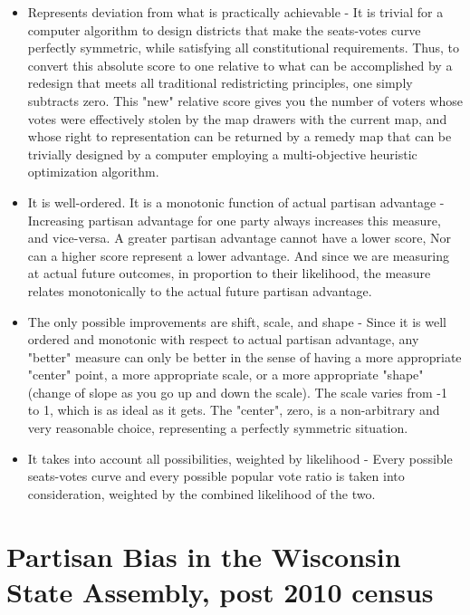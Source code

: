 \documentclass[preprint,12pt]{article}
\begin{document}
\begin{itemize}
\item Represents deviation from what is practically achievable - It is trivial for a computer algorithm to design districts that make the seats-votes curve perfectly symmetric, while satisfying all constitutional requirements.  Thus, to convert this absolute score to one relative to what can be accomplished by a redesign that meets all traditional redistricting principles, one simply subtracts zero.  This "new" relative score gives you the number of voters whose votes were effectively stolen by the map drawers with the current map, and whose right to representation can be returned by a remedy map that can be trivially designed by a computer employing a multi-objective heuristic optimization algorithm.

\item It is well-ordered.  It is a monotonic function of actual partisan advantage - Increasing partisan advantage for one party always increases this measure, and vice-versa.  A greater partisan advantage cannot have a lower score, Nor can a higher score represent a lower advantage.  And since we are measuring at actual future outcomes, in proportion to their likelihood, the measure relates monotonically to the actual future partisan advantage.
 
\item The only possible improvements are shift, scale, and shape - Since it is well ordered and monotonic with respect to actual partisan advantage, any "better" measure can only be better in the sense of having a more appropriate "center" point, a more appropriate scale, or a more appropriate "shape" (change of slope as you go up and down the scale).  The scale varies from -1 to 1, which is as ideal as it gets.  The "center",  zero, is a non-arbitrary and very reasonable choice, representing a perfectly symmetric situation.   
 
\item It takes into account all possibilities, weighted by likelihood - Every possible seats-votes curve and every possible popular vote ratio is taken into consideration, weighted by the combined likelihood of the two.
 
\end{itemize}


\section{Partisan Bias in the Wisconsin State Assembly, post 2010 census\label{sec:Wis}}
\end{document}
